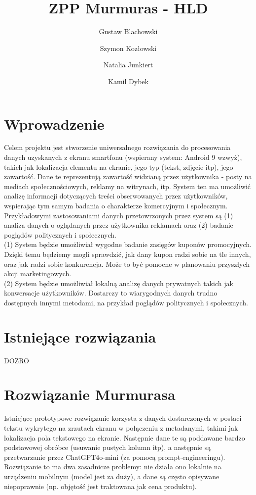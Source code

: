 \documentclass[12pt]{article}
\title{ZPP Murmuras - HLD}
\author{Gustaw Blachowski \and Szymon Kozłowski \and Natalia Junkiert \and Kamil Dybek}
\date{}
\begin{document}
\maketitle

\section*{Wprowadzenie}

Celem projektu jest stworzenie uniwersalnego rozwiązania do procesowania danych uzyskanych z ekranu smartfonu (wspierany system: Android 9 wzwyż), takich jak lokalizacja elementu na ekranie, jego typ (tekst, zdjęcie itp), jego zawartość. Dane te reprezentują zawartość widzianą przez użytkownika - posty na mediach społecznościowych, reklamy na witrynach, itp. System ten ma umożliwić analizę informacji dotyczących treści obserwowanych przez użytkowników, wspierając tym samym badania o charakterze komercyjnym i społecznym. \\

Przykładowymi zastosowaniami danych przetowrzonych przez system są (1) analiza danych o oglądanych przez użytkownika reklamach oraz (2) badanie poglądów politycznych i społecznych. \\

(1) System będzie umożliwiał wygodne badanie zasięgów kuponów promocyjnych. Dzięki temu będziemy mogli sprawdzić, jak dany kupon radzi sobie na tle innych, oraz jak radzi sobie konkurencja. Może to być pomocne w planowaniu przyszłych akcji marketingowych. \\

(2) System będzie umożliwiał lokalną analizę danych prywatnych takich jak konwersacje użytkowników. Dostarczy to wiarygodnych danych trudno dostępnych innymi metodami, na przykład poglądów politycznych i społecznych.


\section*{Istniejące rozwiązania}
DOZRO

\section*{Rozwiązanie Murmurasa}
Istniejące prototypowe rozwiązanie korzysta z danych dostarczonych w postaci tekstu wykrytego na zrzutach ekranu w połączeniu z metadanymi, takimi jak lokalizacja pola tekstowego na ekranie. Następnie dane te są poddawane bardzo podstawowej obróbce (usuwanie pustych kolumn itp), a następnie są przetwarzanie przez ChatGPT4o-mini (za pomocą prompt-engineeringu). Rozwiązanie to ma dwa zasadnicze problemy: nie działa ono lokalnie na urządzeniu mobilnym (model jest za duży), a dane są często opisywane niepoprawnie (np. objętość jest traktowana jak cena produktu).
\end{document}

